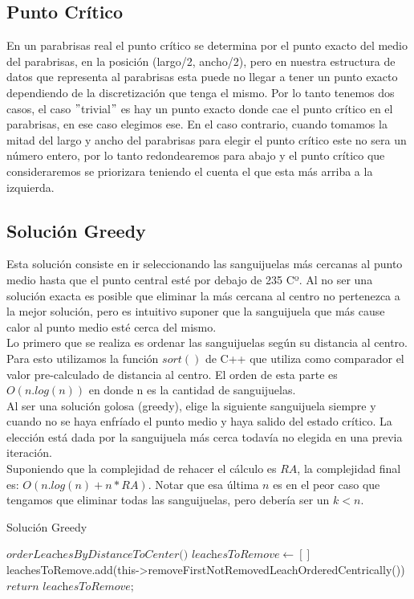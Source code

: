 \subsection{Punto Crítico}
En un parabrisas real el punto crítico se determina por el punto exacto del medio del parabrisas, en la posición (largo/2, ancho/2), pero en nuestra estructura de datos que representa al parabrisas esta puede no llegar a tener un punto exacto dependiendo de la discretización que tenga el mismo. Por lo tanto tenemos dos casos, el caso $"$trivial$"$ es hay un punto exacto donde cae el punto crítico en el parabrisas, en ese caso elegimos ese. En el caso contrario, cuando tomamos la mitad del largo y ancho del parabrisas para elegir el punto crítico este no sera un número entero, por lo tanto redondearemos para abajo y el punto crítico que consideraremos se priorizara teniendo el cuenta el que esta más arriba a la izquierda.

\subsection{Solución Greedy}
Esta solución consiste en ir seleccionando las sanguijuelas más cercanas al punto medio hasta que el punto central esté por debajo de 235 Cº. Al no ser una solución exacta es posible que eliminar la más cercana al centro no pertenezca a la mejor solución, pero es intuitivo suponer que la sanguijuela que más cause calor al punto medio esté cerca del mismo. \\
Lo primero que se realiza es ordenar las sanguijuelas según su distancia al centro. Para esto utilizamos la función $sort()$ de C++ que utiliza como comparador el valor pre-calculado de distancia al centro. El orden de esta parte es $O(n.log(n))$ en donde n es la cantidad de sanguijuelas.\\
Al ser una solución golosa (greedy), elige la siguiente sanguijuela siempre y cuando no se haya enfríado el punto medio y haya salido del estado crítico. La elección está dada por la sanguijuela más cerca todavía no elegida en una previa iteración.\\
Suponiendo que la complejidad de rehacer el cálculo es $RA$, la complejidad final es:  $O(n.log(n) + n*RA)$. Notar que esa última $n$ es en el peor caso que tengamos que eliminar todas las sanguijuelas, pero debería ser un $k < n$.

\newpage

\begin{algorithm}
\caption{Solución Greedy}\label{euclid}
\begin{algorithmic}[1]
\State $\textit{orderLeachesByDistanceToCenter()}$
\State $\textit{leachesToRemove} \gets []$
\Do
    \State leachesToRemove.add(this->removeFirstNotRemovedLeachOrderedCentrically())
\State $\textit{return leachesToRemove;}$
\end{algorithmic}
\end{algorithm}

